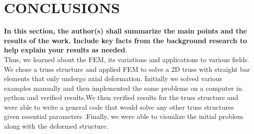 
\chapter{CONCLUSIONS}

{\bf\color{red}In this section, the author(s) shall  summarize the main points and the results of the work. Include key facts from the background research to help explain your results as needed}.\\
	Thus, we learned about the FEM, its variations and applications to various fields. We chose a truss structure and applied FEM to solve a 2D truss with straight bar elements that only undergo axial deformation. Initially we solved various examples manually and then implemented the same problems on a computer in python and verified results.We then verified results for the truss structure and were able to write a general code that would solve any other truss structures given essential parameters .Finally, we were able to visualize the initial problem along with the deformed structure. 



